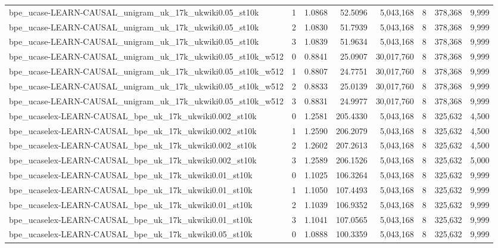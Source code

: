 \begin{tabular}{lrrrrrrr}
bpe\_ucase-LEARN-CAUSAL\_unigram\_uk\_17k\_ukwiki0.05\_st10k & 1 & 1.0868 & 52.5096 & 5,043,168 & 8 & 378,368 & 9,999 \\
bpe\_ucase-LEARN-CAUSAL\_unigram\_uk\_17k\_ukwiki0.05\_st10k & 2 & 1.0830 & 51.7939 & 5,043,168 & 8 & 378,368 & 9,999 \\
bpe\_ucase-LEARN-CAUSAL\_unigram\_uk\_17k\_ukwiki0.05\_st10k & 3 & 1.0839 & 51.9634 & 5,043,168 & 8 & 378,368 & 9,999 \\
bpe\_ucase-LEARN-CAUSAL\_unigram\_uk\_17k\_ukwiki0.05\_st10k\_w512 & 0 & 0.8841 & 25.0907 & 30,017,760 & 8 & 378,368 & 9,999 \\
bpe\_ucase-LEARN-CAUSAL\_unigram\_uk\_17k\_ukwiki0.05\_st10k\_w512 & 1 & 0.8807 & 24.7751 & 30,017,760 & 8 & 378,368 & 9,999 \\
bpe\_ucase-LEARN-CAUSAL\_unigram\_uk\_17k\_ukwiki0.05\_st10k\_w512 & 2 & 0.8833 & 25.0139 & 30,017,760 & 8 & 378,368 & 9,999 \\
bpe\_ucase-LEARN-CAUSAL\_unigram\_uk\_17k\_ukwiki0.05\_st10k\_w512 & 3 & 0.8831 & 24.9977 & 30,017,760 & 8 & 378,368 & 9,999 \\
bpe\_ucaselex-LEARN-CAUSAL\_bpe\_uk\_17k\_ukwiki0.002\_st10k & 0 & 1.2581 & 205.4330 & 5,043,168 & 8 & 325,632 & 4,500 \\
bpe\_ucaselex-LEARN-CAUSAL\_bpe\_uk\_17k\_ukwiki0.002\_st10k & 1 & 1.2590 & 206.2079 & 5,043,168 & 8 & 325,632 & 4,500 \\
bpe\_ucaselex-LEARN-CAUSAL\_bpe\_uk\_17k\_ukwiki0.002\_st10k & 2 & 1.2602 & 207.2613 & 5,043,168 & 8 & 325,632 & 4,500 \\
bpe\_ucaselex-LEARN-CAUSAL\_bpe\_uk\_17k\_ukwiki0.002\_st10k & 3 & 1.2589 & 206.1526 & 5,043,168 & 8 & 325,632 & 5,000 \\
bpe\_ucaselex-LEARN-CAUSAL\_bpe\_uk\_17k\_ukwiki0.01\_st10k & 0 & 1.1025 & 106.3264 & 5,043,168 & 8 & 325,632 & 9,999 \\
bpe\_ucaselex-LEARN-CAUSAL\_bpe\_uk\_17k\_ukwiki0.01\_st10k & 1 & 1.1050 & 107.4493 & 5,043,168 & 8 & 325,632 & 9,999 \\
bpe\_ucaselex-LEARN-CAUSAL\_bpe\_uk\_17k\_ukwiki0.01\_st10k & 2 & 1.1039 & 106.9352 & 5,043,168 & 8 & 325,632 & 9,999 \\
bpe\_ucaselex-LEARN-CAUSAL\_bpe\_uk\_17k\_ukwiki0.01\_st10k & 3 & 1.1041 & 107.0565 & 5,043,168 & 8 & 325,632 & 9,999 \\
bpe\_ucaselex-LEARN-CAUSAL\_bpe\_uk\_17k\_ukwiki0.05\_st10k & 0 & 1.0888 & 100.3359 & 5,043,168 & 8 & 325,632 & 9,999 \\

\end{tabular}
